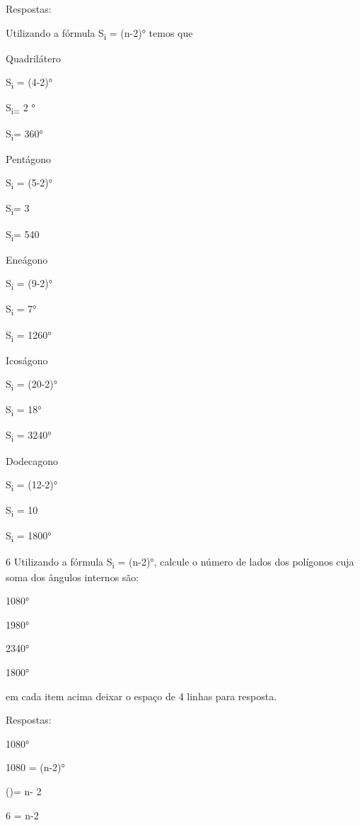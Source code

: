 Respostas:

Utilizando a fórmula S\textsubscript{i} = (n-2)° temos que

\item Quadrilátero

S\textsubscript{i} = (4-2)°

S\textsubscript{i=} 2 °

S\textsubscript{i}= 360°

\item Pentágono

S\textsubscript{i} = (5-2)°

S\textsubscript{i}= 3

S\textsubscript{i}= 540

\item Eneágono

S\textsubscript{i} = (9-2)°

S\textsubscript{i} = 7°

S\textsubscript{i} = 1260°

\item Icoságono

S\textsubscript{i} = (20-2)°

S\textsubscript{i} = 18°

S\textsubscript{i} = 3240°

\item Dodecagono

S\textsubscript{i} = (12-2)°

S\textsubscript{i} = 10

S\textsubscript{i} = 1800°

\num{6} Utilizando a fórmula S\textsubscript{i} = (n-2)°, calcule o
número de lados dos polígonos cuja soma dos ângulos internos são:

\item 1080°
\item 1980°
\item 2340°
\item 1800°

em cada item acima deixar o espaço de 4 linhas para resposta.

Respostas:

\item 1080°

1080 = (n-2)°

()= n- 2

6 = n-2

